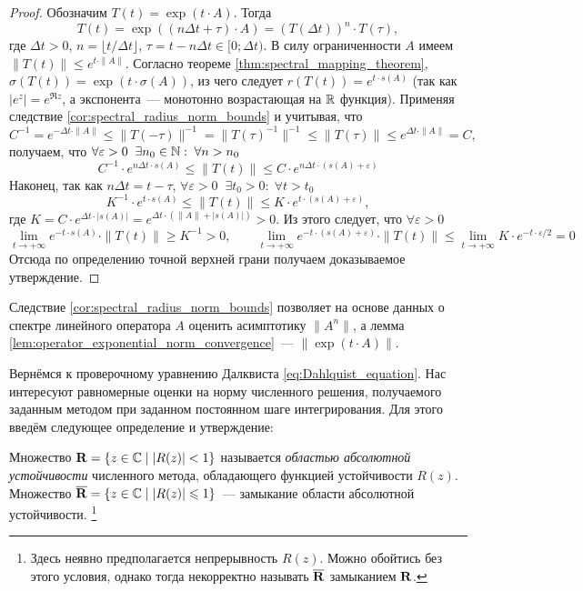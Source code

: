 \begin{proof}
    Обозначим $ T(t) = \exp(t \cdot A) $.
    Тогда
    \[
        T(t) = \exp((n \Delta t + \tau) \cdot A) = \left( T(\Delta t) \right)^n \cdot T(\tau),
    \]
    где $ \Delta t > 0 $, $ n = \lfloor t / \Delta t \rfloor $, $ \tau = t - n \Delta t \in [0;\Delta t) $.
    В силу ограниченности $ A $ имеем $ \| T(t) \| \leqslant e^{t \cdot \| A \|} $.
    Согласно теореме \ref{thm:spectral_mapping_theorem}, $ \sigma(T(t)) = \exp(t \cdot \sigma(A)) $,
    из чего следует $ r(T(t)) = e^{t \cdot s(A)} $
    (так как $ \left| e^z \right| = e^{\Re z} $, а экспонента~--- монотонно возрастающая на $ \mathbb{R} $ функция).
    Применяя следствие \ref{cor:spectral_radius_norm_bounds} и учитывая, что
    \[
        C^{-1} = e^{-\Delta t \cdot \| A \|} \leqslant \| T(-\tau) \|^{-1} = \| T(\tau)^{-1} \|^{-1} \leqslant \| T(\tau) \| \leqslant e^{\Delta t \cdot \| A \|} = C,
    \]
    получаем, что $ \forall \varepsilon > 0 \;\; \exists n_0 \in \mathbb{N}: \; \forall n > n_0 $
    \[
        C^{-1} \cdot e^{n \Delta t \cdot s(A)} \leqslant \| T(t) \| \leqslant C \cdot e^{n \Delta t \cdot (s(A) + \varepsilon)}
    \]
    Наконец, так как $ n \Delta t = t - \tau $, $ \forall \varepsilon > 0 \;\; \exists t_0 > 0: \; \forall t > t_0 $
    \[
        K^{-1} \cdot e^{t \cdot s(A)} \leqslant \| T(t) \| \leqslant K \cdot e^{t \cdot (s(A) + \varepsilon)},
    \]
    где $ K = C \cdot e^{\Delta t \cdot |s(A)|} = e^{\Delta t \cdot (\|A\| + |s(A)|)} > 0 $. %
    Из этого следует, что $ \forall \varepsilon > 0 $
    \[
        \lim_{t \to +\infty} e^{-t \cdot s(A)} \cdot \| T(t) \| \geqslant K^{-1} > 0,
        \qquad
        \lim_{t \to +\infty} e^{-t \cdot (s(A) + \varepsilon)} \cdot \| T(t) \| \leqslant \lim_{t \to +\infty} K \cdot e^{-t \cdot \varepsilon / 2} = 0
    \]
    Отсюда по определению точной верхней грани получаем доказываемое утверждение.
\end{proof}

Следствие \ref{cor:spectral_radius_norm_bounds} позволяет на основе данных о спектре линейного оператора $ A $ оценить асимптотику $ \| A^n \| $,
а лемма \ref{lem:operator_exponential_norm_convergence}~--- $ \| \exp(t \cdot A) \| $.

Вернёмся к проверочному уравнению Далквиста \eqref{eq:Dahlquist_equation}.
Нас интересуют равномерные оценки на норму численного решения, получаемого заданным методом при заданном постоянном шаге интегрирования.
Для этого введём следующее определение и утверждение:

\begin{definition}
    \label{def:stability_region}
    Множество $ \mathbf{R} = \{ z \in \mathbb{C} \mid | R(z) | < 1 \} $ называется \emph{областью абсолютной устойчивости} численного метода, обладающего функцией устойчивости $ R(z) $.
    Множество $ \overline{\mathbf{R}} = \{ z \in \mathbb{C} \mid | R(z) | \leqslant 1 \} $~--- замыкание области абсолютной устойчивости.%
    \footnote{Здесь неявно предполагается непрерывность $ R(z) $.
    Можно обойтись без этого условия, однако тогда некорректно называть $ \overline{\mathbf{R}} $ замыканием $ \mathbf{R} $.}
\end{definition}


